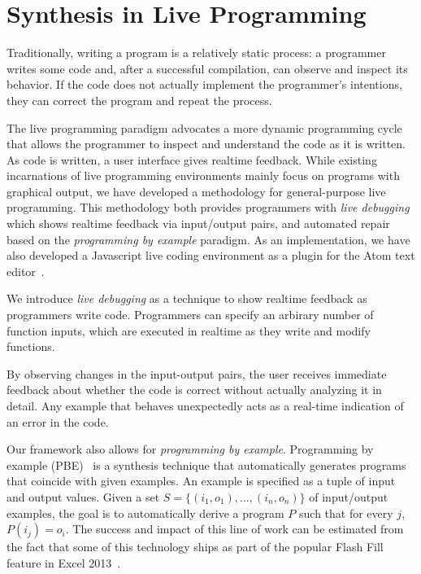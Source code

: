 \section{Synthesis in Live Programming}
\label{sec:intro}


Traditionally, writing a program is a relatively static process: a programmer writes some code and, after a successful compilation, can observe and inspect its behavior. If the code does not actually implement the programmer's intentions, they can correct the program and repeat the process.

The live programming paradigm advocates a more dynamic programming cycle that allows the programmer to inspect and understand the code as it is written. As code is written, a user interface gives realtime feedback.  While existing incarnations of live programming environments mainly focus on programs with graphical output, we have developed a methodology for general-purpose live programming.  
This methodology both provides programmers with \textit{live debugging} which shows realtime feedback via input/output pairs, and automated repair based on the \textit{programming by example} paradigm. 
As an implementation, we have also developed a Javascript live coding environment as a plugin for the Atom text editor~\cite{Atom}.

We introduce \textit{live debugging} as a technique to show realtime feedback as programmers write code.
Programmers can specify an arbirary number of function inputs,
which are executed in realtime as they write and modify functions.

By observing changes in the input-output pairs,
the user receives immediate feedback about whether the code is correct without actually analyzing it in detail.
Any example that behaves unexpectedly acts as a real-time indication of an error in the code. 

Our framework also allows for \textit{programming by example}.
Programming by example (PBE)~\cite{cypher93,lieberman01,synasc12} is a synthesis technique that automatically generates programs that coincide with given examples. An example is specified as a tuple of input and output values. Given a set $S= \{(i_1, o_1),\ldots, (i_n, o_n)\}$ of input/output examples, the goal is to automatically derive a program $P$ such that for every $j$, $P(i_j) = o_i$. The success and impact of this line of work can be estimated from the fact that some of this technology ships as part of the popular Flash Fill feature in Excel 2013~\cite{flashFillPOPL}.

